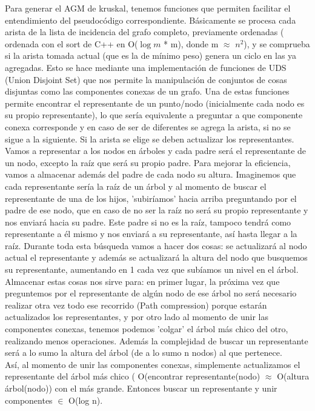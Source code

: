 \documentclass[11pt,a4paper]{article}
\begin{document}
Para generar el AGM de kruskal, tenemos funciones que permiten facilitar el entendimiento del pseudocódigo correspondiente. Básicamente se procesa cada arista de la lista de incidencia del grafo completo, previamente ordenadas ( ordenada con el sort de C++ en O($\log{m}$ * m), donde m $\approx$ $n^2$), y se comprueba si la arista tomada actual (que es la de mínimo peso) genera un ciclo en las ya agregadas. Esto se hace mediante una implementación de funciones de UDS (Union Disjoint Set) que nos permite la manipulación de conjuntos de cosas disjuntas como las componentes conexas de un grafo. Una de estas funciones permite encontrar el representante de un punto/nodo (inicialmente cada nodo es su propio representante), lo que sería equivalente a preguntar a que componente conexa corresponde y en caso de ser de diferentes se agrega la arista, si no se sigue a la siguiente. Si la arista se elige se deben actualizar los representantes. Vamos a representar a los nodos en árboles y cada padre será el representante de un nodo, excepto la raíz que será su propio padre. Para mejorar la eficiencia, vamos a almacenar además del padre de cada nodo su altura. Imaginemos que cada representante sería la raíz de un árbol y al momento de buscar el representante de una de los hijos, 'subiríamos' hacia arriba preguntando por el padre de ese nodo, que en caso de no ser la raíz no será su propio representante y nos enviará hacia su padre. Este padre si no es la raíz, tampoco tendrá como representante a él mismo y nos enviará a su representante, así hasta llegar a la raíz. Durante toda esta búsqueda vamos a hacer dos cosas: se actualizará al nodo actual el representante y además se actualizará la altura del nodo que busquemos su representante, aumentando en 1 cada vez que subíamos un nivel en el árbol. Almacenar estas cosas nos sirve para: en primer lugar, la próxima vez que preguntemos por el representante de algún nodo de ese árbol no será necesario realizar otra vez todo ese recorrido (Path compression) porque estarán actualizados los representantes, y por otro lado al momento de unir las componentes conexas, tenemos podemos 'colgar' el árbol más chico del otro, realizando menos operaciones. Además la complejidad de buscar un representante será a lo sumo la altura del árbol (de a lo sumo n nodos) al que pertenece.\\
Así, al momento de unir las componentes conexas, simplemente actualizamos el representante del árbol más chico ( O(encontrar representante(nodo) $\approx$ O(altura árbol(nodo)) con el más grande. Entonces buscar un representante y unir componentes $\in$ O(log n).
\end{document}
